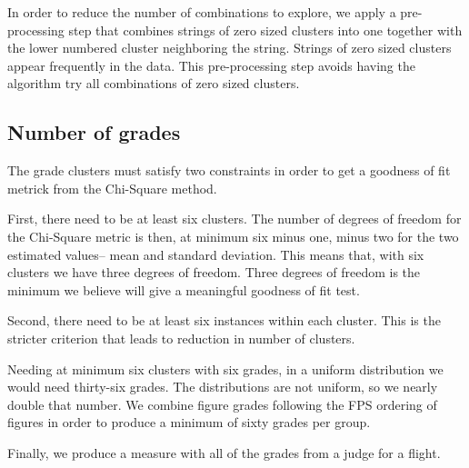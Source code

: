 In order to reduce the number of combinations to explore, we apply a
pre-processing step that combines strings of zero sized clusters into
one together with the lower numbered cluster neighboring the string.
Strings of zero sized clusters appear frequently in the data.
This pre-processing step
avoids having the algorithm try all combinations of zero sized clusters.

\subsection{Number of grades}

The grade clusters must satisfy two constraints in order to get a goodness
of fit metrick from the Chi-Square method.

First, there need to be at least six clusters. The number of degrees of freedom
for the Chi-Square metric is then, at minimum six minus one, minus two for
the two estimated values-- mean and standard deviation. This means that, with
six clusters we have three degrees of freedom. Three degrees of freedom
is the minimum we believe will give a meaningful goodness of fit test.

Second, there need to be at least six instances within each cluster. This is
the stricter criterion that leads to reduction in number of clusters.

Needing at minimum six clusters with six grades, in a uniform distribution
we would need thirty-six grades. The distributions are not uniform, so we
nearly double that number. We combine figure grades following the FPS ordering
of figures in order to produce a minimum of sixty grades per group.

Finally, we produce a measure with all of the grades from a judge for a flight.
